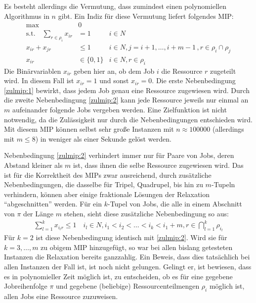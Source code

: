 \documentclass{scrreprt}
\begin{document}
Es besteht allerdings die Vermutung, dass zumindest einen polynomiellen Algorithmus in $n$ gibt. Ein Indiz für diese Vermutung liefert folgendes MIP:
\begin{align}
    \text{max} \quad &0 \label{zulmip:obj} \\
    \text{s.t.}\quad \sum_{r\in\rho_i} x_{ir} &= 1 & i\in N \label{zulmip:1} \\
    x_{ir} + x_{jr} &\leq 1 & i\in N, j=i+1,\ldots,i+m-1 \, ,r\in\rho_i\cap\rho_j \label{zulmip:2} \\
    x_{ir} &\in \{0,1\} & i\in N, r\in\rho_i
\end{align}
Die Binärvariablen $x_{ir}$ geben hier an, ob dem Job $i$ die Ressource $r$ zugeteilt wird.
In diesem Fall ist $x_{ir}=1$ und sonst $x_{ir}=0$.
Die erste Nebenbedingung \ref{zulmip:1} bewirkt, dass jedem Job genau eine Ressource zugewiesen wird.
Durch die zweite Nebenbedingung \ref{zulmip:2} kann jede Ressource jeweils nur einmal an $m$ aufeinander folgende Jobs vergeben werden.
Eine Zielfunktion ist nicht notwendig, da die Zulässigkeit nur durch die Nebenbedingungen entschieden wird.
Mit diesem MIP können selbst sehr große Instanzen mit $n\approx 100000$ (allerdings mit $m\leq 8$) in weniger als einer Sekunde gelöst werden.

Nebenbedingung \ref{zulmip:2} verhindert immer nur für Paare von Jobs, deren Abstand kleiner als $m$ ist, dass ihnen die selbe Ressource zugewiesen wird.
Das ist für die Korrektheit des MIPs zwar ausreichend, durch zusätzliche Nebenbedingungen, die dasselbe für Tripel, Quadrupel, bis hin zu $m$-Tupeln verhindern,
können aber einige fraktionale Lösungen der Relaxation "`abgeschnitten"' werden.
Für ein $k$-Tupel von Jobs, die alle in einem Abschnitt von $\pi$ der Länge $m$ stehen, sieht diese zusätzliche Nebenbedingung so aus:
\begin{align}
    \sum_{l=1}^k x_{i_lr} \leq 1 \quad i_l\in N, i_1<i_2<\ldots<i_k<i_1+m, r\in\bigcap_{l=1}^k \rho_{i_l}
\end{align}
Für $k=2$ ist diese Nebenbedingung identisch mit \ref{zulmip:2}.
Wird sie für $k=3,\ldots,m$ zu obigem MIP hinzugefügt, so war bei allen bislang getesteten Instanzen die Relaxation bereits ganzzahlig.
Ein Beweis, dass dies tatsächlich bei allen Instanzen der Fall ist, ist noch nicht gelungen.
Gelingt er, ist bewiesen, dass es in polynomieller Zeit möglich ist, zu entscheiden, ob es für eine gegebene Jobreihenfolge $\pi$ und 
gegebene (beliebige) Ressourcenteilmengen $\rho_i$ möglich ist, allen Jobs eine Ressource zuzuweisen.
\end{document}
